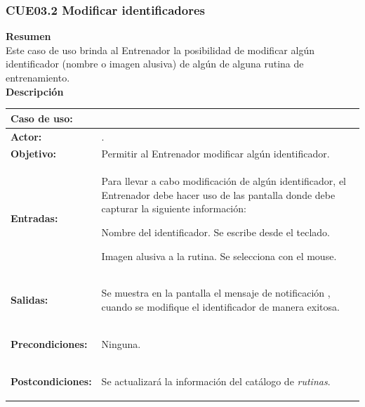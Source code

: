\subsubsection{CUE03.2 Modificar identificadores}
\label{cu:CUE03.2}

\textbf{\textcolor[rgb]{0, 0, 0.545098}{Resumen}} \\

Este caso de uso brinda al Entrenador la posibilidad de modificar algún identificador (nombre o imagen alusiva) de algún de alguna rutina de entrenamiento.\\

\textbf{\textcolor[rgb]{0, 0, 0.545098}{Descripción}}

\begin{table}[H]
\centering
\begin{tabular}{| l | p{12 cm} |}
\hline
\rowcolor[rgb]{0.529412, 0.807843, 0.980392} {\textbf{Caso de uso:}} & \hspace{7em}{\textbf{CUE03.2 Modificar identificadores}}\\
\hline
\textbf{Actor:} &  \nameref{act:Entrenador}. \\
\hline
\textbf{Objetivo:} & Permitir al Entrenador modificar algún identificador.\\
\hline
\textbf{Entradas:} & Para llevar a cabo modificación de algún identificador, el Entrenador debe hacer uso de las pantalla \nameref{pant:IUE03.2} donde debe capturar la siguiente información:
		\begin{compactitem} 
			\setlength\itemsep{-0.25em}
			\item Nombre del identificador. Se escribe desde el teclado.
			\item Imagen alusiva a la rutina. Se selecciona con el mouse.
		\end{compactitem} \\
\hline
\textbf{Salidas:} & \vspace{-2mm}	%
					\begin{compactitem}
						\setlength\itemsep{-0.25em}
						\item Se muestra en la pantalla \nameref{pant:IUE03.2} el mensaje de notificación \nameref{msj:MSG01}, cuando se modifique el identificador de manera exitosa.
					\end{compactitem}\\
\hline
\textbf{Precondiciones:} & 	\vspace{-2mm}	%
							\begin{compactitem}
								\setlength\itemsep{-0.25em}
								\item Ninguna.
							\end{compactitem}\\
\hline
\textbf{Postcondiciones:} & \vspace{-2mm}	%
							\begin{compactitem}
								\item Se actualizará la información del catálogo de \textit{rutinas}.
							\end{compactitem}\\
							

\end{tabular}
\end{table}
